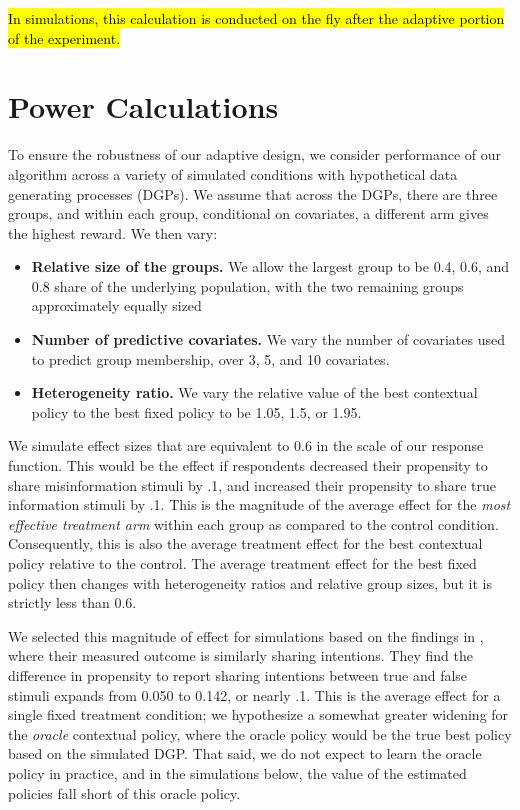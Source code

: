 \documentclass[letterpaper, 12pt, parskip=full,]{scrartcl}
\begin{document}
\hl{In simulations, this calculation is conducted on the fly after the adaptive portion of the experiment. }


\section{Power Calculations}
To ensure the robustness of our adaptive design, we consider performance of our algorithm across a variety of simulated conditions with hypothetical data generating processes (DGPs). We assume that across the DGPs, there are three groups, and within each group, conditional on covariates, a different arm gives the highest reward. We then vary:
\begin{itemize}
\item \textbf{Relative size of the groups.} We allow the largest group to be 0.4, 0.6, and 0.8 share of the underlying population, with the two remaining groups approximately equally sized
\item \textbf{Number of predictive covariates.} We vary the number of covariates used to predict group membership, over 3, 5, and 10 covariates. 
\item \textbf{Heterogeneity ratio.} We vary the relative value of the best contextual policy to the best fixed policy to be 1.05, 1.5, or 1.95. 
\end{itemize}

We simulate effect sizes that are equivalent to 0.6 in the scale of our response function. This would be the effect if respondents decreased their propensity to share misinformation stimuli by .1, and increased their propensity to share true information stimuli by .1. This is the magnitude of the average effect for the \textit{most effective treatment arm} within each group as compared to the control condition. Consequently, this is also the average treatment effect for the best contextual policy relative to the control. The average treatment effect for the best fixed policy then changes with heterogeneity ratios and relative group sizes, but it is strictly less than 0.6. 

We selected this magnitude of effect for simulations based on the findings in \cite{pennycook2020fighting}, where their measured outcome is similarly sharing intentions. They find the difference in propensity to report sharing intentions between true and false stimuli expands from 0.050 to 0.142, or nearly .1. This is the average effect for a single fixed treatment condition; we hypothesize a somewhat greater widening for the \textit{oracle} contextual policy, where the oracle policy would be the true best policy based on the simulated DGP. That said, we do not expect to learn the oracle policy in practice, and in the simulations below, the value of the estimated policies fall short of this oracle policy. 
\end{document}
